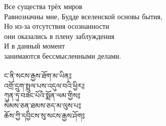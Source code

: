 Все существа трёх миров \\
Равнозначны мне, Будде вселенской основы бытия, \\
Но из-за отсутствия осознанности \\
они оказались в плену заблуждения \\
И в данный момент \\
занимаются бессмысленными делами.\\
\\
{\ti
ང་ནི་སངས་རྒྱས་ཐོག་མ་ཡིན༔ \\
འགྲོ་དྲུག་སྤྲུལ་པས་འདུལ་བའི་ཕྱིར༔ \\
ཀུན་ཏུ་བཟང་པོའི་སྨོན་ལམ་གྱིས༔ \\
སེམས་ཅན་ཐམས་ཅད་མ་ལུས་པ༔ \\
ཆོས་ཀྱི་དབྱིངས་སུ་སངས་རྒྱས་ཤོག༔}\\
\\

